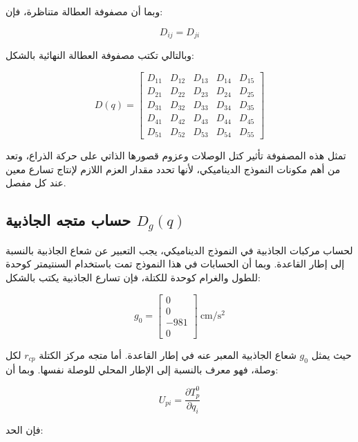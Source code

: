 وبما أن مصفوفة العطالة متناظرة، فإن:

\begin{equation*}
D_{ij}=D_{ji}
\end{equation*}

وبالتالي تكتب مصفوفة العطالة النهائية بالشكل:

\begin{equation*}
D(q)=
\begin{bmatrix}
D_{11} & D_{12} & D_{13} & D_{14} & D_{15} \\
D_{21} & D_{22} & D_{23} & D_{24} & D_{25} \\
D_{31} & D_{32} & D_{33} & D_{34} & D_{35} \\
D_{41} & D_{42} & D_{43} & D_{44} & D_{45} \\
D_{51} & D_{52} & D_{53} & D_{54} & D_{55}
\end{bmatrix}
\end{equation*}

تمثل هذه المصفوفة تأثير كتل الوصلات وعزوم قصورها الذاتي على حركة الذراع، وتعد من أهم مكونات النموذج الديناميكي، لأنها تحدد مقدار العزم اللازم لإنتاج تسارع معين عند كل مفصل.














\subsection{حساب متجه الجاذبية $D_g(q)$}

لحساب مركبات الجاذبية في النموذج الديناميكي، يجب التعبير عن شعاع الجاذبية بالنسبة إلى إطار القاعدة. وبما أن الحسابات في هذا النموذج تمت باستخدام السنتيمتر كوحدة للطول والغرام كوحدة للكتلة، فإن تسارع الجاذبية يكتب بالشكل:

\[
g_0 =
\begin{bmatrix}
0 \\
0 \\
-981 \\
0
\end{bmatrix}
\ \mathrm{cm/s^2}
\]

حيث يمثل $g_0$ شعاع الجاذبية المعبر عنه في إطار القاعدة. أما متجه مركز الكتلة $r_{cp}$ لكل وصلة، فهو معرف بالنسبة إلى الإطار المحلي للوصلة نفسها. وبما أن:

\[
U_{pi} =
\frac{\partial T_p^0}{\partial q_i}
\]

فإن الحد:

